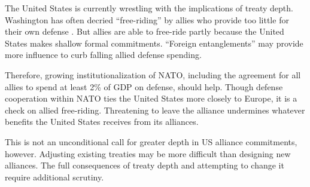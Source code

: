 \documentclass[12pt]{article}
\begin{document}
The United States is currently wrestling with the implications of treaty depth. 
Washington has often decried ``free-riding'' by allies who provide too little for their own defense \citep{Lanoszka2015}. 
But allies are able to free-ride partly because the United States makes shallow formal commitments. 
``Foreign entanglements'' may provide more influence to curb falling allied defense spending. 

 
Therefore, growing institutionalization of NATO, including the agreement for all allies to spend at least 2\% of GDP on defense, should help.
Though defense cooperation within NATO ties the United States more closely to Europe, it is a check on allied free-riding. 
Threatening to leave the alliance undermines whatever benefits the United States receives from its alliances. 

 
This is not an unconditional call for greater depth in US alliance commitments, however. 
Adjusting existing treaties may be more difficult than designing new alliances. 
The full consequences of treaty depth and attempting to change it require additional scrutiny. 

 



\singlespace
 
 
\end{document}
